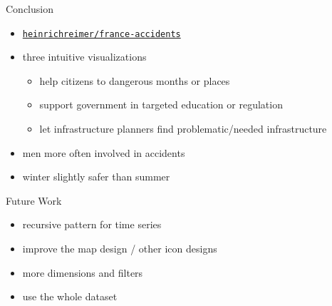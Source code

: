 \documentclass[english]{mlutalk}
\begin{document}
\begin{frame}{Conclusion}
  \begin{itemize}
    \item[\faIcon{github}] \href{https://github.com/heinrichreimer/france-accidents}{\texttt{heinrichreimer/france-accidents}}
    \item three intuitive visualizations
    \begin{itemize}
      \item help citizens to dangerous months or places
      \item support government in targeted education or regulation
      \item let infrastructure planners find problematic/needed infrastructure
    \end{itemize}
    \item men more often involved in accidents
    \item winter slightly safer than summer
  \end{itemize}
  \vspace{1ex}
  \begin{block}{Future Work}
    \begin{itemize}
      \item recursive pattern for time series
      \item improve the map design / other icon designs
      \item more dimensions and filters
      \item use the whole dataset
    \end{itemize}
  \end{block}
  \thankyou
\end{frame}

\appendix
\section{\appendixname}

\bibliographyframe
\end{document}
